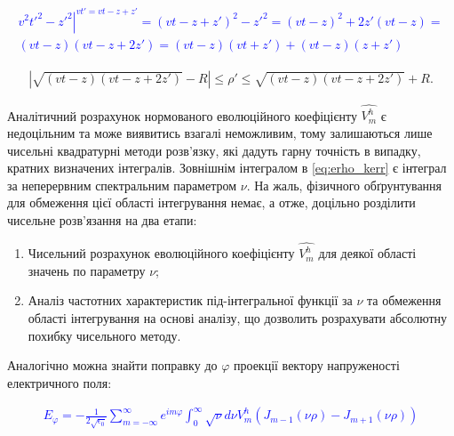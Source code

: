 \textcolor{blue} { \begin{equation*} \begin{aligned}
\left. v^2 t'^2 - z'^2 \right|^{vt' = vt - z + z'} = 
(vt - z + z')^2 - z'^2 = (vt - z)^2 + 2 z' (vt - z) = \\
(vt - z) (vt - z + 2 z') = (vt - z) (vt + z') + (vt - z) (z + z')
\end{aligned} \end{equation*} }

\begin{equation} \begin{aligned}
\left| \sqrt{(vt - z) (vt - z + 2 z')} - R \right| \leq \rho' \leq 
\sqrt{(vt - z) (vt - z + 2 z')} + R.
\end{aligned} \end{equation}

Аналітичний розрахунок нормованого еволюційного коефіцієнту $ \hat{V_m^h} $
є недоцільним та може виявитись взагалі неможливим, тому залишаються лише
чисельні квадратурні методи розв'язку, які дадуть гарну точність в випадку,
кратних визначених інтегралів. Зовнішнім інтегралом в \eqref{eq:erho_kerr} є 
інтеграл за неперервним спектральним параметром $ \nu $. На жаль, фізичного
обґрунтування для обмеження цієї області інтегрування немає, а отже,
доцільно розділити чисельне розв'язання на два етапи:

\begin{enumerate}
	\item Чисельний розрахунок еволюційного коефіцієнту $ \hat{V_m^h} $ 
	для деякої області значень по параметру $ \nu $;
	\item Аналіз частотних характеристик під-інтегральної функції за $ \nu $ 
	та обмеження області інтегрування на основі аналізу, що дозволить 
	розрахувати абсолютну похибку чисельного методу.
\end{enumerate}

Аналогічно можна знайти поправку до $ \varphi $ проекції вектору 
напруженості електричного поля:

\textcolor{blue} { \begin{equation*} \begin{aligned}
E_\varphi = - \frac{1}{2 \sqrt{\epsilon_0}} \sum_{m=-\infty}^{\infty} 
e^{im\varphi} \int_{0}^{\infty} \sqrt{\nu} d \nu 
V_m^h \left( J_{m-1} (\nu \rho) - J_{m+1} (\nu \rho) \right)
\end{aligned} \end{equation*} }

